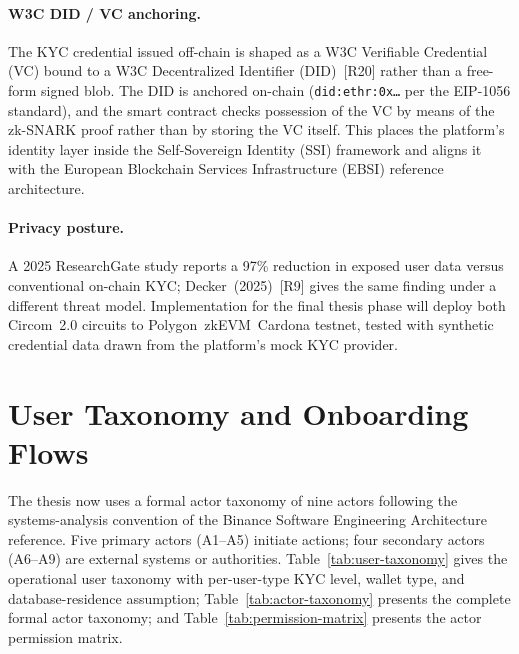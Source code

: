 \documentclass[12pt,a4paper]{report}
\begin{document}
\paragraph{W3C DID / VC anchoring.}
The KYC credential issued off-chain is shaped as a W3C Verifiable Credential (VC) bound to a W3C Decentralized Identifier (DID)~[R20] rather than a free-form signed blob. The DID is anchored on-chain (\texttt{did:ethr:0x\ldots} per the EIP-1056 standard), and the smart contract checks possession of the VC by means of the zk-SNARK proof rather than by storing the VC itself. This places the platform's identity layer inside the Self-Sovereign Identity (SSI) framework and aligns it with the European Blockchain Services Infrastructure (EBSI) reference architecture.

\paragraph{Privacy posture.}
A 2025 ResearchGate study reports a 97\% reduction in exposed user data versus conventional on-chain KYC; Decker~(2025)~[R9] gives the same finding under a different threat model. Implementation for the final thesis phase will deploy both Circom~2.0 circuits to Polygon~zkEVM~Cardona testnet, tested with synthetic credential data drawn from the platform's mock KYC provider.

\section{User Taxonomy and Onboarding Flows}
\label{sec:onboarding}

The thesis now uses a formal actor taxonomy of nine actors following the systems-analysis convention of the Binance Software Engineering Architecture reference. Five primary actors (A1--A5) initiate actions; four secondary actors (A6--A9) are external systems or authorities. Table~\ref{tab:user-taxonomy} gives the operational user taxonomy with per-user-type KYC level, wallet type, and database-residence assumption; Table~\ref{tab:actor-taxonomy} presents the complete formal actor taxonomy; and Table~\ref{tab:permission-matrix} presents the actor permission matrix.
\end{document}
